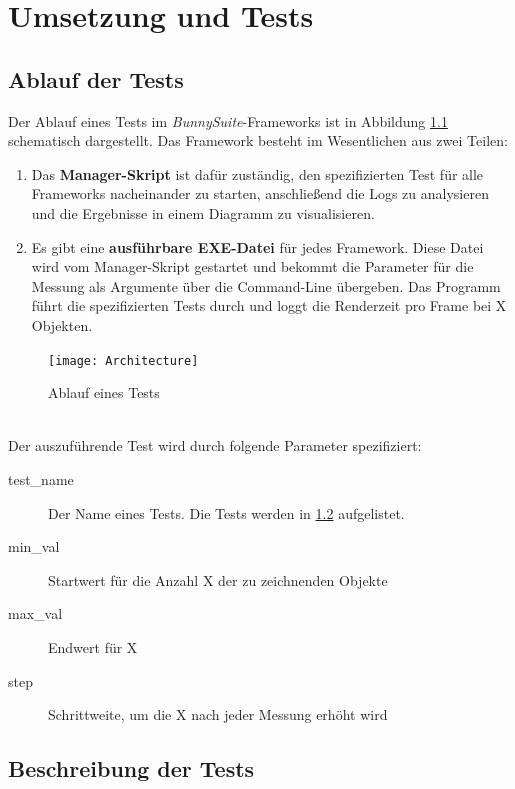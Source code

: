 \chapter{Umsetzung und Tests}

\section{Ablauf der Tests}
Der Ablauf eines Tests im \textit{BunnySuite}-Frameworks ist in Abbildung \ref{dia:architecture} schematisch dargestellt. Das Framework besteht im Wesentlichen aus zwei Teilen:
\begin{enumerate}
\item Das \textbf{Manager-Skript} ist dafür zuständig, den spezifizierten Test für alle Frameworks nacheinander zu starten, anschließend die Logs zu analysieren und die Ergebnisse in einem Diagramm zu visualisieren.
\item Es gibt eine \textbf{ausführbare EXE-Datei} für jedes Framework. Diese Datei wird vom Manager-Skript gestartet und bekommt die Parameter für die Messung als Argumente über die Command-Line übergeben. Das Programm führt die spezifizierten Tests durch und loggt die Renderzeit pro Frame bei X Objekten.
\end{enumerate}
\begin{figure}[h]
\caption{Ablauf eines Tests}
\centering
\texttt{[image: Architecture]}
\label{dia:architecture}
\end{figure}
~\\
Der auszuführende Test wird durch folgende Parameter spezifiziert:\\
\begin{description}
\item[test\_name] Der Name eines Tests. Die Tests werden in \ref{sec:tests} aufgelistet.
\item[min\_val] Startwert für die Anzahl X der zu zeichnenden Objekte
\item[max\_val] Endwert für X
\item[step] Schrittweite, um die X nach jeder Messung erhöht wird
\end{description}

\section{Beschreibung der Tests}
\label{sec:tests}

